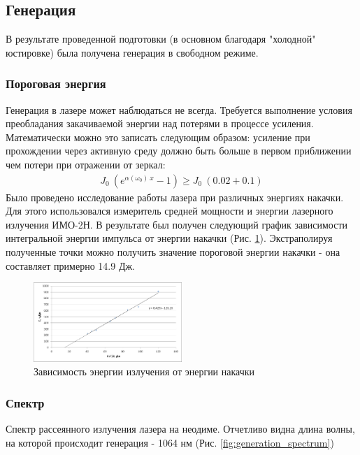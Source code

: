 \documentclass[twocolumn]{article}
\begin{document}
          
        
    
\subsection{Генерация}
В результате проведенной подготовки (в основном благодаря "холодной" юстировке) была получена генерация в свободном режиме. 

\subsubsection{Пороговая энергия}
Генерация в лазере может наблюдаться не всегда. Требуется выполнение условия преобладания закачиваемой энергии над потерями в процессе усиления. Математически можно это записать следующим образом: усиление при прохождении через активную среду должно быть больше в первом приближении чем потери при отражении от зеркал:
\begin{align*}
J_0\ (e^{\alpha(\omega_0)\ x}-1) \geq J_0\ (0.02+0.1)
\end{align*}
Было проведено исследование работы лазера при различных энергиях
накачки. Для этого использовался измеритель средней мощности и энергии лазерного излучения ИМО-2Н. В результате был получен следующий график зависимости интегральной
энергии импульса от энергии накачки (Рис. \ref{fig:pulse_over_pomp_energy}). 
Экстраполируя полученные точки можно получить значение пороговой энергии накачки - она составляет примерно 14.9 Дж. 
        
    \begin{figure}
    \includegraphics[width=0.5\textwidth]{LEMPH Report_files/LEMPH Report_22_0.png}
    \caption{Зависимость энергии излучения от энергии накачки \label{fig:pulse_over_pomp_energy}}
    \end{figure}
    
            
        
    

\subsubsection{Спектр}
Спектр рассеянного излучения лазера на неодиме. Отчетливо видна длина
волны, на которой происходит генерация - 1064 нм (Рис. \ref{fig:generation_spectrum})
\end{document}
